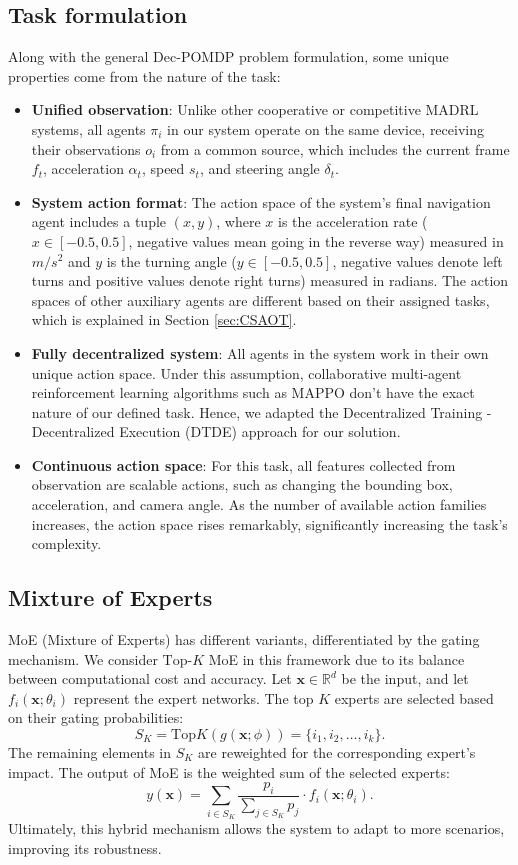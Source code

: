 \documentclass[sigconf]{aamas}
\begin{document}
\subsection{Task formulation}
Along with the general Dec-POMDP problem formulation, some unique properties come from the nature of the task:
\begin{itemize}
    \item \textbf{Unified observation}: Unlike other cooperative or competitive MADRL systems, all agents $\pi_i$ in our system operate on the same device, receiving their observations $o_i$ from a common source, which includes the current frame $f_t$, acceleration $\alpha_t$, speed $s_t$, and steering angle $\delta_t$.
    \item \textbf{System action format}: The action space of the system's final navigation agent includes a tuple \((x, y)\), where \(x\) is the acceleration rate (\(x \in [-0.5, 0.5]\), negative values mean going in the reverse way) measured in \(m / s^2\) and \(y\) is the turning angle (\(y \in [-0.5, 0.5]\), negative values denote left turns and positive values denote right turns) measured in radians. The action spaces of other auxiliary agents are different based on their assigned tasks, which is explained in Section \ref{sec:CSAOT}.
    \item \textbf{Fully decentralized system}: All agents in the system work in their own unique action space. Under this assumption, collaborative multi-agent reinforcement learning algorithms such as MAPPO don't have the exact nature of our defined task. Hence, we adapted the Decentralized Training - Decentralized Execution (DTDE) approach for our solution.
    \item \textbf{Continuous action space}: For this task, all features collected from observation are scalable actions, such as changing the bounding box, acceleration, and camera angle. As the number of available action families increases, the action space rises remarkably, significantly increasing the task's complexity. 
\end{itemize}
\subsection{Mixture of Experts}
MoE (Mixture of Experts) has different variants, differentiated by the gating mechanism. We consider \(\text{Top-}K \) MoE in this framework due to its balance between computational cost and accuracy. Let $\mathbf{x} \in \mathbb{R}^d$ be the input, and let $f_i(\mathbf{x}; \theta_i)$ represent the expert networks. The top $K$ experts are selected based on their gating probabilities:
\begin{equation}
S_K = \text{Top}K \left(g(\mathbf{x}; \phi)\right) = \{i_1, i_2, \dots, i_k\}.
\end{equation}
The remaining elements in \(S_K\) are reweighted for the corresponding expert's impact. The output of MoE is the weighted sum of the selected experts:
\begin{equation}
y(\mathbf{x}) = \sum_{i \in S_K} \frac{p_i}{\sum_{j \in S_K} p_j} \cdot f_i(\mathbf{x}; \theta_i).
\end{equation}
Ultimately, this hybrid mechanism allows the system to adapt to more scenarios, improving its robustness.
\end{document}
